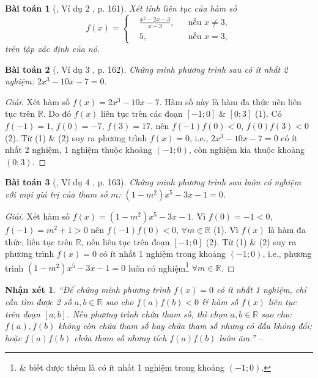 \documentclass{article}
\newtheorem{baitoan}{Bài toán}
\newtheorem{nhanxet}{Nhận xét}
\begin{document}
\begin{baitoan}[\cite{SBT_Toan_11_dai_so_giai_tich_co_ban}, Ví dụ 2 , p. 161]
	Xét tính liên tục của hàm số
	\begin{equation*}
		f(x) = \left\{\begin{split}
			&\frac{x^2 - 2x - 3}{x - 3},&&\mbox{nếu }x\ne3,\\
			&5,&&\mbox{nếu }x = 3,
		\end{split}\right.
	\end{equation*} 
	trên tập xác định của nó.
\end{baitoan}

\begin{baitoan}[\cite{SBT_Toan_11_dai_so_giai_tich_co_ban}, Ví dụ 3 , p. 162]
	Chứng minh phương trình sau có ít nhất 2 nghiệm: $2x^3 - 10x - 7 = 0$.
\end{baitoan}

\begin{proof}[Giải]
	Xét hàm số $f(x) = 2x^3 - 10x - 7$. Hàm số này là hàm đa thức nên liên tục trên $\mathbb{R}$. Do đó $f(x)$ liên tục trên các đoạn $[-1;0]$ \& $[0;3]$ (1). Có $f(-1) = 1$, $f(0) = -7$, $f(3) = 17$, nên $f(-1)f(0) < 0$, $f(0)f(3) < 0$ (2). Từ (1) \& (2) suy ra phương trình $f(x) = 0$, i.e.,  $2x^3 - 10x - 7 = 0$ có ít nhất 2 nghiệm, 1 nghiệm thuộc khoảng $(-1;0)$, còn nghiệm kia thuộc khoảng $(0;3)$.
\end{proof}

\begin{baitoan}[\cite{SBT_Toan_11_dai_so_giai_tich_co_ban}, Ví dụ 4 , p. 163]
	Chứng minh phương trình sau luôn có nghiệm với mọi giá trị của tham số $m$: $(1 - m^2)x^5 - 3x - 1 = 0$.
\end{baitoan}

\begin{proof}[Giải]
	Xét hàm số $f(x) = 	(1 - m^2)x^5 - 3x - 1$. Vì $f(0) = -1 < 0$, $f(-1) = m^2 + 1 > 0$ nên $f(-1)f(0) < 0$, $\forall m\in\mathbb{R}$ (1). Vì $f(x)$ là hàm đa thức, liên tục trên $\mathbb{R}$, nên liên tục trên đoạn $[-1;0]$ (2). Từ (1) \& (2) suy ra phương trình $f(x) = 0$ có ít nhất 1 nghiệm trong khoảng $(-1;0)$, i.e., phương trình $(1 - m^2)x^5 - 3x - 1 = 0$ luôn có nghiệm\footnote{\& biết được thêm là có ít nhất 1 nghiệm trong khoảng $(-1;0)$.} $\forall m\in\mathbb{R}$.
\end{proof}

\begin{nhanxet}
	``Để chứng minh phương trình $f(x) = 0$ có ít nhất 1 nghiệm, chỉ cần tìm được 2 số $a,b\in\mathbb{R}$ sao cho $f(a)f(b) < 0$ \& hàm số $f(x)$ liên tục trên đoạn $[a;b]$. Nếu phương trình chứa tham số, thì chọn $a,b\in\mathbb{R}$ sao cho: $f(a),f(b)$ không còn chứa tham số hay chứa tham số nhưng có dấu không đổi; hoặc $f(a)f(b)$ chứa tham số nhưng tích $f(a)f(b)$ luôn âm.'' -- \cite[p. 163]{SBT_Toan_11_dai_so_giai_tich_co_ban}
\end{nhanxet}
\end{document}
